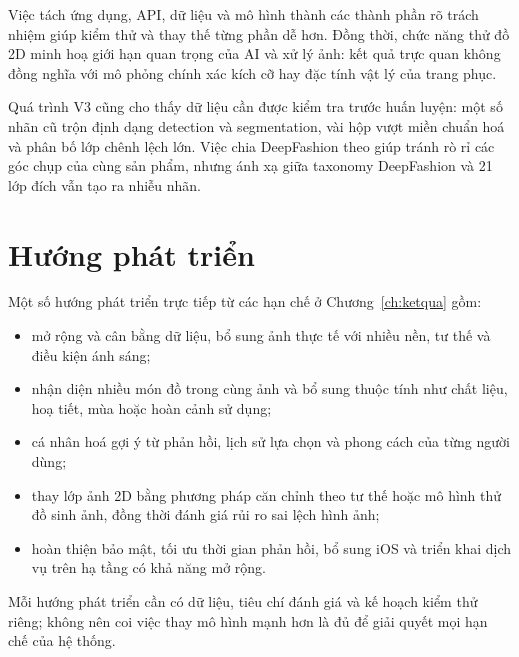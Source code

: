Việc tách ứng dụng, API, dữ liệu và mô hình thành các thành phần rõ trách
nhiệm giúp kiểm thử và thay thế từng phần dễ hơn. Đồng thời, chức năng thử
đồ 2D minh hoạ giới hạn quan trọng của AI và xử lý ảnh: kết quả trực quan
không đồng nghĩa với mô phỏng chính xác kích cỡ hay đặc tính vật lý của
trang phục.

Quá trình V3 cũng cho thấy dữ liệu cần được kiểm tra trước huấn luyện: một số
nhãn cũ trộn định dạng detection và segmentation, vài hộp vượt miền chuẩn hoá
và phân bố lớp chênh lệch lớn. Việc chia DeepFashion theo 
giúp tránh rò rỉ các góc chụp của cùng sản phẩm, nhưng ánh xạ giữa taxonomy
DeepFashion và 21 lớp đích vẫn tạo ra nhiễu nhãn.

\section{Hướng phát triển}

Một số hướng phát triển trực tiếp từ các hạn chế ở
Chương~\ref{ch:ketqua} gồm:
\begin{itemize}[leftmargin=1.6em, itemsep=3pt]
  \item mở rộng và cân bằng dữ liệu, bổ sung ảnh thực tế với nhiều nền, tư
        thế và điều kiện ánh sáng;
  \item nhận diện nhiều món đồ trong cùng ảnh và bổ sung thuộc tính như chất
        liệu, hoạ tiết, mùa hoặc hoàn cảnh sử dụng;
  \item cá nhân hoá gợi ý từ phản hồi, lịch sử lựa chọn và phong cách của
        từng người dùng;
  \item thay lớp ảnh 2D bằng phương pháp căn chỉnh theo tư thế hoặc mô hình
        thử đồ sinh ảnh, đồng thời đánh giá rủi ro sai lệch hình ảnh;
  \item hoàn thiện bảo mật, tối ưu thời gian phản hồi, bổ sung iOS và triển
        khai dịch vụ trên hạ tầng có khả năng mở rộng.
\end{itemize}

Mỗi hướng phát triển cần có dữ liệu, tiêu chí đánh giá và kế hoạch kiểm thử
riêng; không nên coi việc thay mô hình mạnh hơn là đủ để giải quyết mọi hạn
chế của hệ thống.
